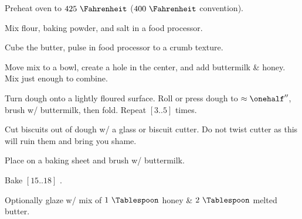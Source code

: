 \begin{preparation}
\item Preheat oven to $425~\Fahrenheit$ ($400~\Fahrenheit$ convention).

\item Mix flour, baking powder, and salt in a food processor.

\item Cube the butter, pulse in food processor to a crumb texture.

\item Move mix to a bowl, create a hole in the center, and add buttermilk \& honey.
    Mix just enough to combine.

\item Turn dough onto a lightly floured surface.
    Roll or press dough to $\approx\onehalf''$, brush w/ buttermilk, then fold.
    Repeat $[3..5]$ times.

\item Cut biscuits out of dough w/ a glass or biscuit cutter.
    Do not twist cutter as this will ruin them and bring you shame.

\item Place on a baking sheet and brush w/ buttermilk.

\item Bake $[15..18]$ \minute.

\item Optionally glaze w/ mix of $1~\Tablespoon$ honey \& $2~\Tablespoon$ melted butter.
\end{preparation}

\recipeend%
